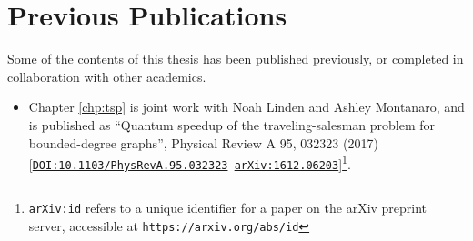 \chapter*{Previous Publications}

Some of the contents of this thesis has been published previously, or completed in collaboration with other academics.

\begin{itemize}
\item Chapter \ref{chp:tsp} is joint work with Noah Linden and Ashley Montanaro, and is published as ``Quantum speedup of the traveling-salesman problem for bounded-degree graphs'', Physical Review A 95, 032323 (2017) [{\tt \href{http://link.aps.org/doi/10.1103/PhysRevA.95.032323}{DOI:10.1103/PhysRevA.95.032323} \href{https://arxiv.org/abs/1612.06203}{arXiv:1612.06203}}]\footnote{{\tt arXiv:id} refers to a unique identifier for a paper on the arXiv preprint server, accessible at {\tt https://arxiv.org/abs/id}}.
\end{itemize}